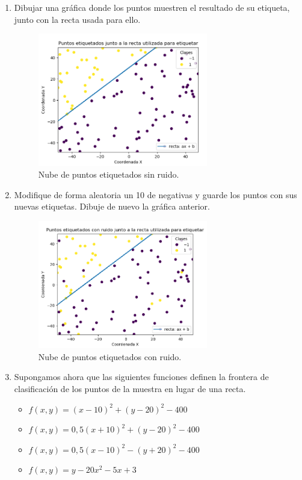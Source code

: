 \documentclass[size=a4, parskip=half, titlepage=false, toc=flat, toc=bib, 12pt]{scrartcl}
\begin{document}
\begin{enumerate}
\begin{enumerate}
\item Dibujar una gráfica donde los puntos muestren el resultado de su etiqueta,
junto con la recta usada para ello.
\begin{figure}[H]
\centering
\includegraphics[width=0.7\textwidth]{./img/sinruido}
\caption{Nube de puntos etiquetados sin ruido.}
\end{figure}
\item Modifique de forma aleatoria un 10 %
de negativas y guarde los puntos con sus nuevas etiquetas. Dibuje de nuevo la gráfica
anterior.
\begin{figure}[H]
\centering
\includegraphics[width=0.7\textwidth]{./img/conruido}
\caption{Nube de puntos etiquetados con ruido.}
\end{figure}
\item Supongamos ahora que las siguientes funciones definen la frontera de
clasificación de los puntos de la muestra en lugar de una recta.
\begin{itemize}
\item $f(x, y) = (x − 10)^2 + (y − 20)^2 − 400$
\item $f(x, y) = 0,5(x + 10)^2 + (y − 20)^2 − 400$
\item $f(x, y) = 0,5(x − 10)^2 − (y + 20)^2 − 400$
\item $f(x, y) = y − 20x^2 − 5x + 3$
\end{itemize}


\end{enumerate}
\end{enumerate}
\end{document}
